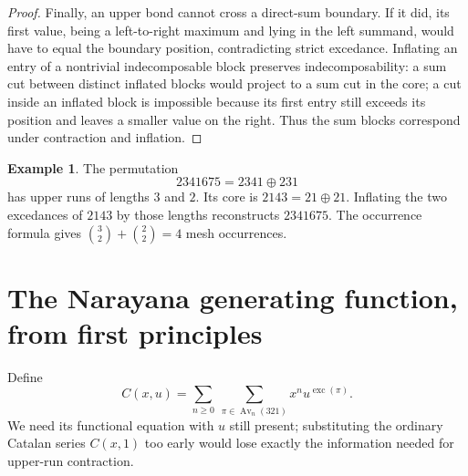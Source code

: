 \documentclass[11pt,letterpaper]{article}
\numberwithin{equation}{section}
\theoremstyle{definition}
\newtheorem{example}[theorem]{Example}
\DeclareMathOperator{\Av}{Av}
\DeclareMathOperator{\exc}{exc}
\begin{document}
\begin{proof}
Finally, an upper bond cannot cross a direct-sum boundary. If it did,
its first value, being a left-to-right maximum and lying in the left
summand, would have to equal the boundary position, contradicting strict
excedance. Inflating an entry of a nontrivial indecomposable block
preserves indecomposability: a sum cut between distinct inflated blocks
would project to a sum cut in the core; a cut inside an inflated block
is impossible because its first entry still exceeds its position and
leaves a smaller value on the right. Thus the sum blocks correspond
under contraction and inflation.
\end{proof}

\begin{example}
The permutation
\[
 2341675=2341\oplus231
\]
has upper runs of lengths $3$ and $2$. Its core is $2143=21\oplus21$.
Inflating the two excedances of $2143$ by those lengths reconstructs
$2341675$. The occurrence formula gives $\binom32+\binom22=4$
mesh occurrences.
\end{example}

\section{The Narayana generating function, from first principles}
\label{sec:narayana}

Define
\begin{equation}
 C(x,u)=\sum_{n\ge0}\ \sum_{\pi\in\Av_n(321)}x^n u^{\exc(\pi)}.
 \label{eq:Cdef}
\end{equation}
We need its functional equation with $u$ still present; substituting the
ordinary Catalan series $C(x,1)$ too early would lose exactly the
information needed for upper-run contraction.
\end{document}
